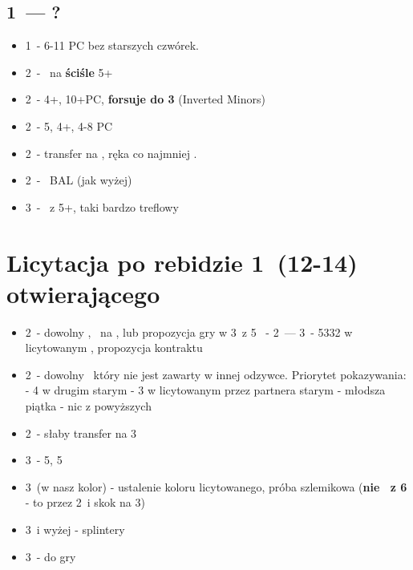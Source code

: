 \documentclass[12pt, a4paper]{article}
\begin{document}
\subsection{1\diams\ --- ?}
\begin{itemize}
    \item 1\nt\ - 6-11 PC bez starszych czwórek.
    \item 2\clubs\ - \gf\ na \textbf{ściśle} 5+\clubs
    \item 2\diams\ - 4+\diams, 10+PC, \textbf{forsuje do 3\diams} (Inverted Minors)
    \item 2\hearts\ - 5\spades, 4+\hearts, 4-8 PC
    \item 2\spades\ - transfer na \nt, ręka co najmniej \inv.
    \item 2\nt\ - \gf\ BAL (jak wyżej)
    \item 3\clubs\ - \inv\ z 5+\clubs, taki bardzo treflowy
\end{itemize}

\pagebreak

\section{Licytacja po rebidzie 1\ntx\ (12-14) otwierającego}
\begin{itemize}
    \item 2\clubs\ - dowolny \inv, \soff\ na \diams, lub propozycja gry w 3\nt\ z 5\major
    \clubs\ - 2\diams\ --- 3\nt\ - 5332 w licytowanym \major, propozycja kontraktu
    \item 2\diams\ - dowolny \gf\, który nie jest zawarty w innej odzywce.
    Priorytet pokazywania:
    \subitem - 4 w drugim starym
    \subitem - 3 w licytowanym przez partnera starym
    \subitem - młodsza piątka
    \subitem - nic z powyższych
    \item 2\nt\ - słaby transfer na 3\clubs
    \item 3\minor\ - 5\major, 5\minor\ \gf\
    \item 3\hearts\ (w nasz kolor) - ustalenie koloru licytowanego, próba szlemikowa
        (\textbf{nie \inv\ z 6} - to przez 2\clubs\ i skok na 3\major)
    \item 3\spades\ i wyżej - splintery
    \item 3\nt\ - do gry
\end{itemize}

\pagebreak
\end{document}
